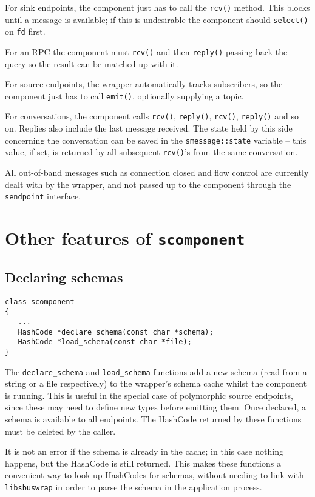 \documentclass[12pt,a4paper,twoside]{article}
\renewcommand{\_}{\texttt{\symbol{95}}}
\begin{document}
For sink endpoints, the component
just has to call the \verb^rcv()^ method.
This blocks until a message is available; if this is undesirable
the component should \verb^select()^ on \verb^fd^ first.

For an RPC the component must \verb^rcv()^ and then \verb^reply()^
passing back the query so the result can be matched up with it.

For source endpoints, the wrapper automatically tracks subscribers, so the
component just has to call \verb^emit()^, optionally supplying a topic.

For conversations, the component calls \verb^rcv()^, \verb^reply()^,
\verb^rcv()^, \verb^reply()^ and so on.
Replies also include the last message received.
The state held by this side concerning the conversation can be saved
in the \verb^smessage::state^ variable -- this value, if set, is
returned by all subsequent \verb^rcv()^'s from the same conversation.

All out-of-band messages such as connection closed and flow control
are currently dealt with by the wrapper, and not passed up to the
component through the \texttt{sendpoint} interface.

\section{Other features of \texttt{scomponent}}

\subsection{Declaring schemas}

\begin{verbatim}
class scomponent
{
   ...
   HashCode *declare_schema(const char *schema);
   HashCode *load_schema(const char *file);
}
\end{verbatim}

The \verb^declare_schema^ and \verb^load_schema^ functions add
a new schema (read from a string or a file respectively) to the wrapper's
schema cache whilst the component is running.
This is useful in the special case of polymorphic
source endpoints, since these may need to define new types
before emitting them.
Once declared, a schema is available to all
endpoints.
The HashCode returned by these functions must be deleted by the caller.

It is not an error if the schema is already in the cache; in this
case nothing happens, but the HashCode is still returned. This makes
these functions a convenient way to look up HashCodes for schemas,
without needing to link with \verb^libsbuswrap^ in order to parse the
schema in the application process.
\end{document}
